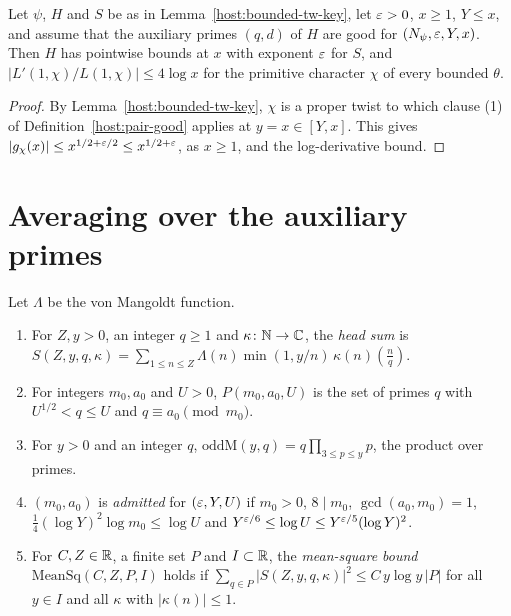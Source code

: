 \begin{lemma}\label{host:bounded-tw}
Let $\psi$, $H$ and $S$ be as in Lemma~\ref{host:bounded-tw-key}, let
$\varepsilon>0$, $x\ge1$, $Y\le x$, and assume that the auxiliary primes $(q,d)$
of $H$ are good for $(N_{\psi},\varepsilon,Y,x)$. Then $H$ has pointwise bounds at
$x$ with exponent $\varepsilon$ for $S$, and $|L'(1,\chi)/L(1,\chi)|\le4\log x$
for the primitive character $\chi$ of every bounded $\theta$.
\end{lemma}
\begin{proof}
By Lemma~\ref{host:bounded-tw-key}, $\chi$ is a proper twist to which
clause (1) of Definition~\ref{host:pair-good} applies at $y=x\in[Y,x]$.
This gives $|g_{\chi}(x)|\le x^{1/2+\varepsilon/2}\le x^{1/2+\varepsilon}$, as $x\ge1$, and
the log-derivative bound.
\end{proof}

\section{Averaging over the auxiliary primes}

\begin{definition}\label{host:head-sum}
Let $\Lambda$ be the von Mangoldt function.
\begin{enumerate}
\item For $Z,y>0$, an integer $q\ge1$ and $\kappa\colon\mathbb{N}\to\mathbb{C}$, the
  \emph{head sum} is
  $S(Z,y,q,\kappa)=\sum_{1\le n\le Z}\Lambda(n)\min(1,y/n)\,\kappa(n)
  \left(\frac nq\right)$.
\item For integers $m_0,a_0$ and $U>0$, $P(m_0,a_0,U)$ is the set of primes
  $q$ with $U^{1/2}<q\le U$ and $q\equiv a_0\pmod{m_0}$.
\item For $y>0$ and an integer $q$, $\mathrm{oddM}(y,q)=q\prod_{3\le p\le
  y}p$, the product over primes.
\item $(m_0,a_0)$ is \emph{admitted} for $(\varepsilon,Y,U)$ if $m_0>0$, $8\mid
  m_0$, $\gcd(a_0,m_0)=1$, $\frac14(\log Y)^2\log m_0\le\log U$ and
  $Y^{\varepsilon/6}\le\log U\le Y^{\varepsilon/5}(\log Y)^2$.
\item For $C,Z\in\mathbb{R}$, a finite set $P$ and $I\subset\mathbb{R}$, the
  \emph{mean-square bound} $\mathrm{MeanSq}(C,Z,P,I)$ holds if
  $\sum_{q\in P}|S(Z,y,q,\kappa)|^2\le C\,y\log y\,|P|$ for all $y\in I$
  and all $\kappa$ with $|\kappa(n)|\le1$.
\end{enumerate}
\end{definition}

